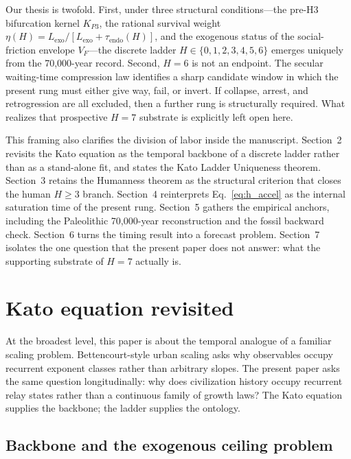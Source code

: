 \documentclass[11pt]{article}
\begin{document}
Our thesis is twofold.
First,
under three structural conditions---the pre-H3 bifurcation kernel
\(K_{P3}\),
the rational survival weight
\(\eta(H)=L_{\mathrm{exo}}/[L_{\mathrm{exo}}+\tau_{\mathrm{endo}}(H)]\),
and the exogenous status of the social-friction envelope
\(V_F\)---the discrete ladder
\(H\in\{0,1,2,3,4,5,6\}\)
emerges uniquely from the 70,000-year record.
Second,
\(H{=}6\) is not an endpoint.
The secular waiting-time compression law identifies a sharp candidate window in which the present rung must either give way,
fail,
or invert.
If collapse,
arrest,
and retrogression are all excluded,
then a further rung is structurally required.
What realizes that prospective \(H{=}7\) substrate is explicitly left open here.

This framing also clarifies the division of labor inside the manuscript.
Section~2 revisits the Kato equation as the temporal backbone of a discrete ladder rather than as a stand-alone fit,
and states the Kato Ladder Uniqueness theorem.
Section~3 retains the Humanness theorem as the structural criterion that closes the human \(H\ge 3\) branch.
Section~4 reinterprets Eq.~\eqref{eq:h_accel} as the internal saturation time of the present rung.
Section~5 gathers the empirical anchors,
including the Paleolithic 70,000-year reconstruction and the fossil backward check.
Section~6 turns the timing result into a forecast problem.
Section~7 isolates the one question that the present paper does not answer:
what the supporting substrate of \(H{=}7\) actually is.

\section{Kato equation revisited}

At the broadest level,
this paper is about the temporal analogue of a familiar scaling problem.
Bettencourt-style urban scaling asks why observables occupy recurrent exponent classes rather than arbitrary slopes.
The present paper asks the same question longitudinally:
why does civilization history occupy recurrent relay states rather than a continuous family of growth laws?
The Kato equation supplies the backbone;
the ladder supplies the ontology.

\subsection{Backbone and the exogenous ceiling problem}\label{sec:theorem}
\end{document}

